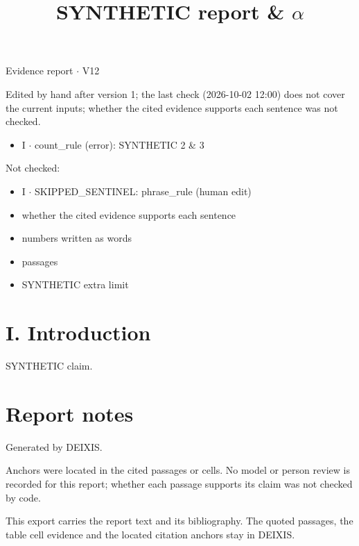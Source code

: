 \documentclass[journal]{IEEEtran}
\begin{document}
\title{SYNTHETIC report \& \ensuremath{\alpha}}

\maketitle

\noindent Evidence report \ensuremath{\cdot} V12

\noindent Edited by hand after version 1; the last check (2026-10-02 12:00) does not cover the current inputs; whether the cited evidence supports each sentence was not checked.

\begin{itemize}
\item I \ensuremath{\cdot} count\_rule (error): SYNTHETIC 2 \& 3
\end{itemize}

\noindent Not checked:

\begin{itemize}
\item I \ensuremath{\cdot} SKIPPED\_SENTINEL: phrase\_rule (human edit)
\item whether the cited evidence supports each sentence
\item numbers written as words
\item passages
\item SYNTHETIC extra limit
\end{itemize}

\section*{I. Introduction}

SYNTHETIC claim. \cite{Synth26}

\section*{Report notes}

Generated by DEIXIS.

Anchors were located in the cited passages or cells. No model or person review is recorded for this report; whether each passage supports its claim was not checked by code.

This export carries the report text and its bibliography. The quoted passages, the table cell evidence and the located citation anchors stay in DEIXIS.




\end{document}
